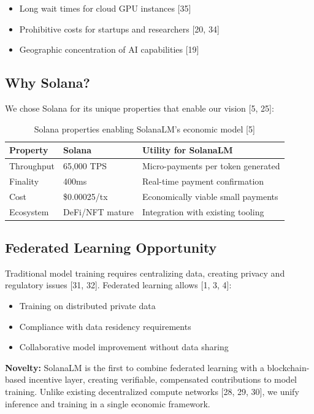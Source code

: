 \documentclass[11pt,a4paper]{article}
\begin{document}
\begin{itemize}
    \item Long wait times for cloud GPU instances [35]
    \item Prohibitive costs for startups and researchers [20, 34]
    \item Geographic concentration of AI capabilities [19]
\end{itemize}

\subsection{Why Solana?}

We chose Solana for its unique properties that enable our vision [5, 25]:

\begin{table}[H]
\centering
\begin{tabular}{@{}lll@{}}
\toprule
\textbf{Property} & \textbf{Solana} & \textbf{Utility for SolanaLM} \\
\midrule
Throughput & 65,000 TPS & Micro-payments per token generated \\
Finality & 400ms & Real-time payment confirmation \\
Cost & \$0.00025/tx & Economically viable small payments \\
Ecosystem & DeFi/NFT mature & Integration with existing tooling \\
\bottomrule
\end{tabular}
\caption{Solana properties enabling SolanaLM's economic model [5]}
\end{table}

\subsection{Federated Learning Opportunity}

Traditional model training requires centralizing data, creating privacy and regulatory issues [31, 32]. Federated learning allows [1, 3, 4]:

\begin{itemize}
    \item Training on distributed private data
    \item Compliance with data residency requirements
    \item Collaborative model improvement without data sharing
\end{itemize}

\textbf{Novelty:} SolanaLM is the first to combine federated learning with a blockchain-based incentive layer, creating verifiable, compensated contributions to model training. Unlike existing decentralized compute networks [28, 29, 30], we unify inference and training in a single economic framework.
\end{document}
